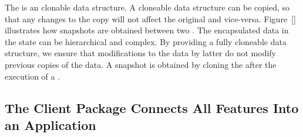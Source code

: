 \documentclass[../ClassicThesis.tex]{subfiles}
\begin{document}
The  is an clonable data structure. A
cloneable data structure can be copied, so that any changes
to the copy will not affect the original and vice-versa.
Figure~\ref{}  illustrates
how snapshots are obtained between two
. The encapsulated data in the state
can be hierarchical and complex. By providing a fully
cloneable data structure, we ensure that modifications to
the data by latter  do not modify
previous copies of the data. A snapshot is obtained by
cloning the  after the execution of a
.







\subsection{The Client Package Connects All Features Into an
  Application}
\label{sec:client-to-application}
\end{document}
